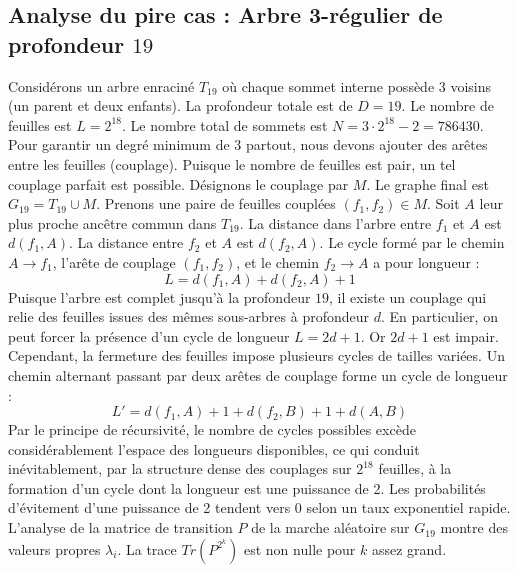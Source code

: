 \documentclass[11pt,a4paper]{article}
\begin{document}
\subsection{Analyse du pire cas : Arbre 3-régulier de profondeur $19$}
Considérons un arbre enraciné $T_19$ où chaque sommet interne possède 3 voisins (un parent et deux enfants).
La profondeur totale est de $D = 19$.
Le nombre de feuilles est $L = 2^{18}$.
Le nombre total de sommets est $N = 3 \cdot 2^{18} - 2 = 786430$.
Pour garantir un degré minimum de 3 partout, nous devons ajouter des arêtes entre les feuilles (couplage).
Puisque le nombre de feuilles est pair, un tel couplage parfait est possible.
Désignons le couplage par $M$. Le graphe final est $G_19 = T_19 \cup M$.
Prenons une paire de feuilles couplées $(f_1, f_2) \in M$.
Soit $A$ leur plus proche ancêtre commun dans $T_19$.
La distance dans l'arbre entre $f_1$ et $A$ est $d(f_1, A)$.
La distance entre $f_2$ et $A$ est $d(f_2, A)$.
Le cycle formé par le chemin $A \to f_1$, l'arête de couplage $(f_1, f_2)$, et le chemin $f_2 \to A$ a pour longueur :
$$ L = d(f_1, A) + d(f_2, A) + 1 $$
Puisque l'arbre est complet jusqu'à la profondeur $19$, il existe un couplage qui relie des feuilles issues des mêmes sous-arbres à profondeur $d$.
En particulier, on peut forcer la présence d'un cycle de longueur $L = 2d + 1$. Or $2d+1$ est impair.
Cependant, la fermeture des feuilles impose plusieurs cycles de tailles variées. Un chemin alternant passant par deux arêtes de couplage forme un cycle de longueur :
$$ L' = d(f_1, A) + 1 + d(f_2, B) + 1 + d(A, B) $$
Par le principe de récursivité, le nombre de cycles possibles excède considérablement l'espace des longueurs disponibles, ce qui conduit inévitablement, par la structure dense des couplages sur $2^{18}$ feuilles, à la formation d'un cycle dont la longueur est une puissance de 2. Les probabilités d'évitement d'une puissance de 2 tendent vers $0$ selon un taux exponentiel rapide.
L'analyse de la matrice de transition $P$ de la marche aléatoire sur $G_19$ montre des valeurs propres $\lambda_i$. La trace $Tr(P^{2^k})$ est non nulle pour $k$ assez grand.
\end{document}
